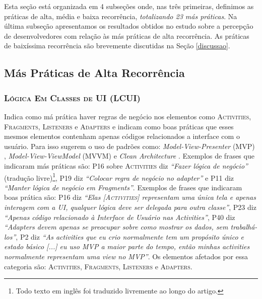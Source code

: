 Esta seção está organizada em 4 subseções onde, nas três primeiras, definimos as práticas de alta, média e baixa recorrência, \emph{totalizando 23 más práticas}. Na última subseção apresentamos os resultados obtidos no estudo sobre a percepção de desenvolvedores com relação às más práticas de alta recorrência. As práticas de baixíssima recorrência são brevemente discutidas na Seção \ref{discussao}.

\subsection{Más Práticas de Alta Recorrência}

\subsubsection{\textsc{Lógica Em Classes de UI (LCUI)}}
Indica como má prática haver regras de negócio nos elementos como \textsc{Activities}, \textsc{Fragments}, \textsc{Listeners} e \textsc{Adapters} e indicam como boas práticas que esses mesmos elementos contenham apenas códigos relacionados a interface com o usuário. Para isso sugerem o uso de padrões como: \textit{Model-View-Presenter} (MVP) \cite{MartinFowlerGUIArchitectures, WikipediaMVP}, \textit{Model-View-ViewModel} (MVVM) \cite{WikipediaMVVM} e \textit{Clean Architecture} \cite{CleanArchitecture}. Exemplos de frases que indicaram más práticas são: P16 sobre \textsc{Activities} diz \textit{``Fazer lógica de negócio''} (tradução livre)\footnote{Todo texto em inglês foi traduzido livremente ao longo do artigo.}, P19 diz \textit{``Colocar regra de negócio no adapter''} e P11 diz \textit{``Manter lógica de negócio em Fragments''}. Exemplos de frases que indicaram boas prática são: P16 diz \textit{``Elas [\textsc{Activities}] representam uma única tela e apenas interagem com a UI, qualquer lógica deve ser delegada para outra classe''}, P23 diz \textit{``Apenas código relacionado à Interface de Usuário nas Activities''}, P40 diz \textit{``Adapters devem apenas se preocupar sobre como mostrar os dados, sem trabalhá-los''}, P2 diz \textit{``As activities que eu crio normalmente tem um propósito único e estado básico [...] eu uso MVP a maior parte do tempo, então minhas activities normalmente representam uma view no MVP''}. Os elementos afetados por essa categoria são: \textsc{Activities}, \textsc{Fragments}, \textsc{Listeners} e \textsc{Adapters}. 

